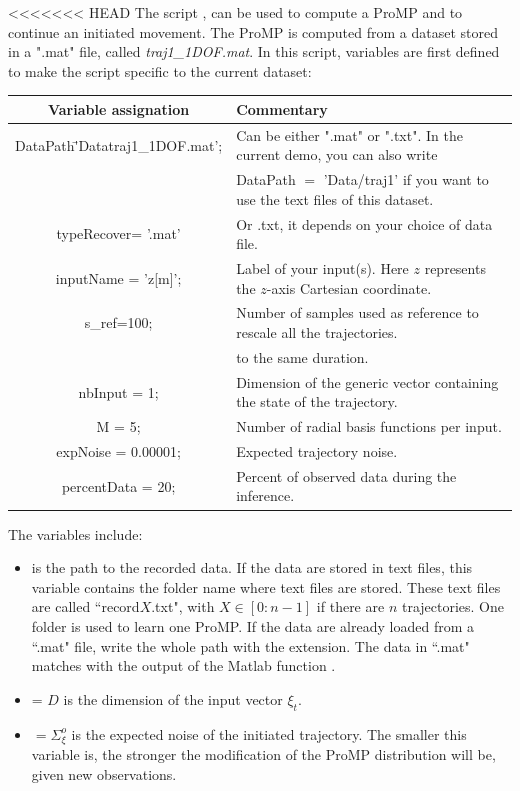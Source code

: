 \documentclass[utf8]{frontiersSCNS} %
\begin{document}
<<<<<<< HEAD
The script , can be used to compute a ProMP and to continue an initiated movement. The ProMP is computed from a dataset stored in a ".mat" file, called \textit{traj1\_1DOF.mat}. In this script, variables are first defined to make the script specific to the current dataset:
\begin{tabular}{|c|l|}
  \hline
  \textbf{Variable assignation} & \textbf{Commentary}\\
  \hline
  DataPath\= 'Data\/traj1\_1DOF.mat'; & Can be either ".mat" or ".txt". In the current demo,  you can also write\\
  & DataPath $=$ 'Data/traj1' if you want to use the text files of this dataset.\\
     \hline
  typeRecover= '.mat' & Or .txt, it depends on your choice of data file.\\
    \hline
  inputName = {'z[m]'}; & Label of your input(s). Here $z$ represents the $z$-axis Cartesian coordinate.\\
    \hline
  s\_ref=100; & Number of samples used as reference to rescale all the trajectories.\\
  & to the same duration.\\
    \hline
  nbInput = 1; & Dimension of the generic vector containing the state of the trajectory.\\
    \hline
  M = 5;  & Number of radial basis functions per input.\\
    \hline
  expNoise = 0.00001;  & Expected trajectory noise.\\
    \hline
  percentData = 20;  & Percent of observed data during the inference.\\
  \hline
  \end{tabular}

The variables include:
\begin{itemize}
\item {} is the path to the recorded data. If the data are stored in text files, this variable contains the folder name where text files are stored. These text files are called ``record$X$.txt", with $X \in [0:n-1]$ if there are $n$ trajectories. One folder is used to learn one ProMP. If the data are already loaded from a ``.mat" file, write the whole path with the extension. The data in ``.mat" matches with the output of the Matlab function . %
\item {}= $D$ is the dimension of the input vector $\xi_t$. 
\item {} $= \Sigma^o_\xi$ is the expected noise of the initiated trajectory. The smaller this variable is, the stronger the modification of the ProMP distribution will be, given new observations.
\end{itemize}
\end{document}
